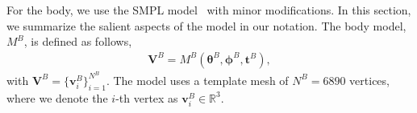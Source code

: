 For the body, we use the SMPL model~\cite{Loper2015} with minor modifications. 
In this section, we summarize the salient aspects of the model in our notation. The body model, $M^B$, is defined as follows,
\begin{align}
\mathbf{V}^B = M^B (\boldsymbol{\theta}^B, \boldsymbol{\phi}^B, \boldsymbol{t}^B ),
\end{align}
with $\mathbf{V}^B = \{ \mathbf{v}^B_i\}_{i=1}^{N^B}$. 
The model uses a template mesh of $N^B{=}6890$ vertices, where we denote the $i$-th vertex as $\mathbf{v}^B_i\in\mathds{R}^3$. 
